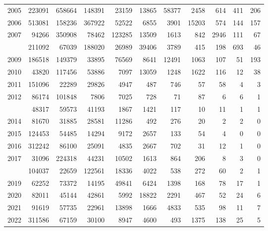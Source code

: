 \documentclass[
]{article}
\begin{document}
\begin{longtable}[t]{lrrrrrrrrrr}
2005 & 223091 & 658664 & 148391 & 23159 & 13865 & 58377 & 2458 & 614 & 411 & 206\\
2006 & 513081 & 158236 & 367922 & 52522 & 6855 & 3901 & 15203 & 574 & 144 & 157\\
2007 & 94266 & 350908 & 78462 & 123285 & 13509 & 1613 & 842 & 2946 & 111 & 67\\
\addlinespace
2008 & 211092 & 67039 & 188020 & 26989 & 39406 & 3789 & 415 & 198 & 693 & 46\\
2009 & 186518 & 149379 & 33895 & 76569 & 8641 & 12491 & 1063 & 107 & 51 & 193\\
2010 & 43820 & 117456 & 53886 & 7097 & 13059 & 1248 & 1622 & 116 & 12 & 38\\
2011 & 151096 & 22289 & 29826 & 4947 & 487 & 746 & 57 & 58 & 4 & 3\\
2012 & 86174 & 101848 & 7806 & 7025 & 728 & 71 & 87 & 6 & 6 & 1\\
\addlinespace
2013 & 48317 & 59573 & 41193 & 1867 & 1421 & 117 & 10 & 11 & 1 & 1\\
2014 & 81670 & 31885 & 28581 & 11286 & 492 & 276 & 20 & 2 & 2 & 0\\
2015 & 124453 & 54485 & 14294 & 9172 & 2657 & 133 & 54 & 4 & 0 & 0\\
2016 & 312242 & 86100 & 25091 & 4835 & 2667 & 702 & 31 & 12 & 1 & 0\\
2017 & 31096 & 224318 & 44231 & 10502 & 1613 & 864 & 206 & 8 & 3 & 0\\
\addlinespace
2018 & 104037 & 22659 & 122561 & 18336 & 4022 & 538 & 272 & 60 & 2 & 1\\
2019 & 62252 & 73372 & 14195 & 49841 & 6424 & 1398 & 168 & 78 & 17 & 1\\
2020 & 82011 & 45144 & 42861 & 5992 & 18822 & 2291 & 467 & 52 & 24 & 6\\
2021 & 91619 & 57735 & 22961 & 13898 & 1666 & 4833 & 535 & 98 & 11 & 7\\
2022 & 311586 & 67159 & 30100 & 8947 & 4600 & 493 & 1375 & 138 & 25 & 5\\*
\end{longtable}
\end{document}
